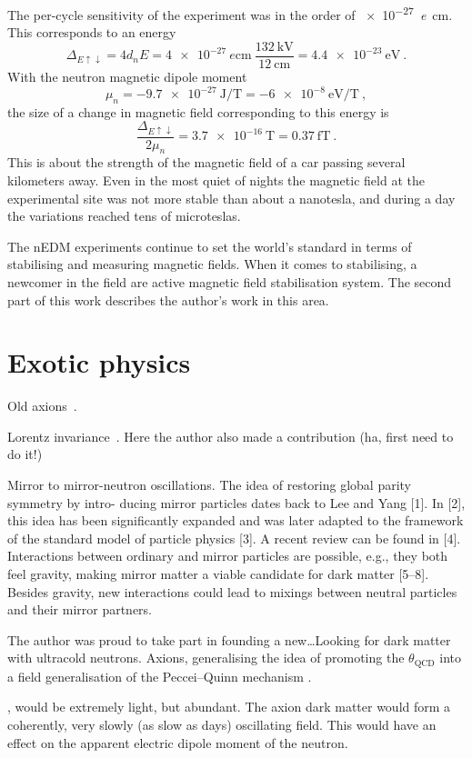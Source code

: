 The per-cycle sensitivity of the experiment was in the order of \SI{e-27}{\elementarycharge\centi\meter}. This corresponds to an energy
\begin{equation}
  \Delta_{E\uparrow\downarrow} = 4 d_n E = \SI{4e-27}{\elementarycharge\centi\meter} \ \frac{ \SI{132}{\kilo\volt} }{ \SI{12}{\centi\meter} } = \SI{4.4e-23}{\electronvolt} \ .
\end{equation}
With the neutron magnetic dipole moment
\begin{equation}
  \mu_n = \SI{-9.7e-27}{\joule\per\tesla} = \SI{-6e-8}{\electronvolt\per\tesla} \ ,
\end{equation}
the size of a change in magnetic field corresponding to this energy is
\begin{equation}
  \frac{ \Delta_{E\uparrow\downarrow} }{2 \mu_n} = \SI{3.7e-16}{\tesla} = \SI{0.37}{\femto\tesla} \ .
\end{equation}
This is about the strength of the magnetic field of a car passing several kilometers away. Even in the most quiet of nights the magnetic field at the experimental site was not more stable than about a nanotesla, and during a day the variations reached tens of microteslas.

The nEDM experiments continue to set the world's standard in terms of stabilising and measuring magnetic fields.
When it comes to stabilising, a newcomer in the field are active magnetic field stabilisation system. The second part of this work describes the author's work in this area.


\section{Exotic physics}

Old axions~\cite{Afach2015Exotic}.

Lorentz invariance~\cite{Altarev2009}. Here the author also made a contribution (ha, first need to do it!)

Mirror to mirror-neutron oscillations. The idea of restoring global parity symmetry by intro- ducing mirror particles dates back to Lee and Yang [1]. In [2], this idea has been significantly expanded and was later adapted to the framework of the standard model of particle physics [3]. A recent review can be found in [4]. Interactions between ordinary and mirror particles are possible, e.g., they both feel gravity, making mirror matter a viable candidate for dark matter [5–8]. Besides gravity, new interactions could lead to mixings between neutral particles and their mirror partners.~\cite{PhysRevD.80.032003}

The author was proud to take part in founding a new\ldots Looking for dark matter with ultracold neutrons. Axions, generalising the idea of promoting the $\theta_\text{QCD}$ into a field  generalisation of the Peccei--Quinn mechanism \cite{PhysRevLett.38.1440}.

, would be extremely light, but abundant. The axion dark matter would form a coherently, very slowly (as slow as days) oscillating field. This would have an effect on the apparent electric dipole moment of the neutron.